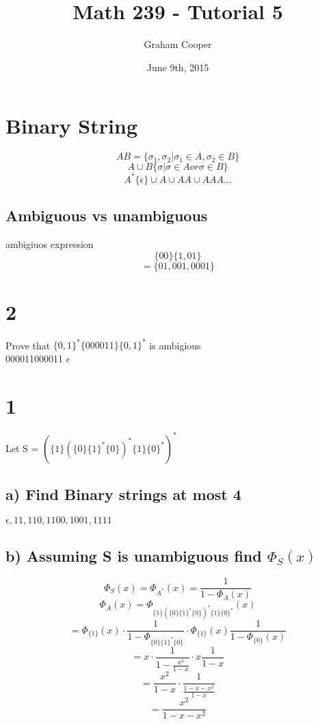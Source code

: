 \documentclass[12pt]{article}
\title{\vspace{-15ex}Math 239 - Tutorial 5\vspace{-1ex}}
\date{June 9th, 2015}
\author{Graham Cooper}
\begin{document}
	\maketitle
	
	\section*{Binary String}
	$$AB = \{\sigma_1, \sigma_2 | \sigma_1 \in A, \sigma_2 \in B \}$$
	$$A \cup B \{\sigma | \sigma \in A or \sigma \in B \}$$
	$$A^* \{\epsilon \} \cup A \cup AA \cup AAA ...$$
	
	\subsection*{Ambiguous vs unambiguous}
	ambigiuos expression\\
	$$\{00\}\{1,01\}$$
	$$= \{01, 001, 0001 \}$$
	
	\section*{2}
	Prove that $\{0,1\}^* \{000011\} \{0,1\}^*$ is ambigious\\
	
	000011000011 $\epsilon$\\
	
	\section*{1}
	Let S = $(\{1 \}(\{0\}\{1\}^*\{0\})^*\{1\}\{0\}^*)^*$\\
	
	\subsection*{a) Find Binary strings at most 4}
	
	$\epsilon, 11, 110, 1100, 1001, 1111$\\
	
	\subsection*{b) Assuming S is unambiguous find $\Phi_S(x)$}
	
	$$\Phi_S(x) = \Phi_{A^*}(x) = \frac{1}{1- \Phi_A(x)}$$
	$$\Phi_A(x) = \Phi_{\{1\}(\{0\}\{1\}^*\{0\})^*\{1\}\{0\}^*}(x)$$
	$$ = \Phi_{\{1\}}(x) \cdot \frac{1}{1 - \Phi_{\{0\}\{1\}^*\{0\}}} \cdot \Phi_{\{1\}}(x) \frac{1}{1 - \Phi_{\{0\}}(x)}$$
	$$ = x \cdot \frac{1}{1- \frac{x^2}{1-x}} \cdot x \frac{1}{1-x}$$
	$$ = \frac{x^2}{1-x} \cdot \frac{1}{\frac{1-x-x^2}{1-x}}$$
	$$ = \frac{x^2}{1-x-x^2}$$
	
\end{document}
